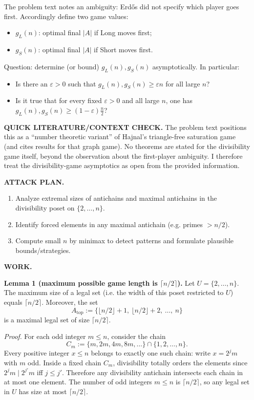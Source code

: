 The problem text notes an ambiguity: Erd\H{o}s did not specify which player goes first.
Accordingly define two game values:
\begin{itemize}
\item $g_L(n)$: optimal final $|A|$ if Long moves first;
\item $g_S(n)$: optimal final $|A|$ if Short moves first.
\end{itemize}

Question: determine (or bound) $g_L(n),g_S(n)$ asymptotically. In particular:
\begin{itemize}
\item Is there an $\varepsilon>0$ such that $g_L(n),g_S(n)\ge \varepsilon n$ for all large $n$?
\item Is it true that for every fixed $\varepsilon>0$ and all large $n$, one has $g_L(n),g_S(n)\ge (1-\varepsilon)\frac n2$?
\end{itemize}

\medskip
\noindent\textbf{QUICK LITERATURE/CONTEXT CHECK.}
The problem text positions this as a ``number theoretic variant'' of Hajnal's triangle-free saturation game (and cites results for that graph game). No theorems are stated for the divisibility game itself, beyond the observation about the first-player ambiguity.
I therefore treat the divisibility-game asymptotics as open from the provided information.

\medskip
\noindent\textbf{ATTACK PLAN.}
\begin{enumerate}
\item Analyze extremal sizes of antichains and maximal antichains in the divisibility poset on $\{2,\dots,n\}$.
\item Identify forced elements in any maximal antichain (e.g. primes $>n/2$).
\item Compute small $n$ by minimax to detect patterns and formulate plausible bounds/strategies.
\end{enumerate}

\medskip
\noindent\textbf{WORK.}

\noindent\textbf{Lemma 1 (maximum possible game length is $\lceil n/2\rceil$).}
Let $U=\{2,\dots,n\}$. The maximum size of a legal set (i.e. the width of this poset restricted to $U$) equals $\lceil n/2\rceil$.
Moreover, the set
\[
A_\mathrm{top}:=\{\lfloor n/2\rfloor+1,\ \lfloor n/2\rfloor+2,\ \dots,\ n\}
\]
is a maximal legal set of size $\lceil n/2\rceil$.

\noindent\emph{Proof.}
For each odd integer $m\le n$, consider the chain
\[
C_m:=\{m,2m,4m,8m,\dots\}\cap\{1,2,\dots,n\}.
\]
Every positive integer $x\le n$ belongs to exactly one such chain: write $x=2^j m$ with $m$ odd.
Inside a fixed chain $C_m$, divisibility totally orders the elements since $2^j m\mid 2^{j'}m$ iff $j\le j'$.
Therefore any divisibility antichain intersects each chain in at most one element.
The number of odd integers $m\le n$ is $\lceil n/2\rceil$, so any legal set in $U$ has size at most $\lceil n/2\rceil$.

